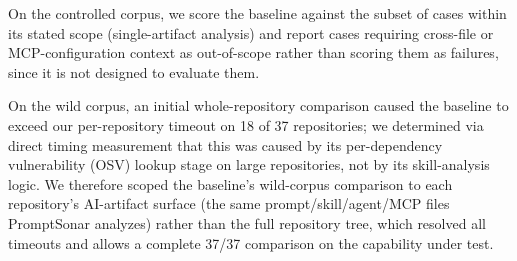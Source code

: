 \documentclass[sigconf,anonymous,review]{acmart}
\newcommand{\sysname}{PromptSonar}
\begin{document}
On the controlled corpus, we score the baseline against the subset of cases within its stated scope (single-artifact analysis) and report cases requiring cross-file or MCP-configuration context as out-of-scope rather than scoring them as failures, since it is not designed to evaluate them.

On the wild corpus, an initial whole-repository comparison caused the baseline to exceed our per-repository timeout on 18 of 37 repositories; we determined via direct timing measurement that this was caused by its per-dependency vulnerability (OSV) lookup stage on large repositories, not by its skill-analysis logic. We therefore scoped the baseline's wild-corpus comparison to each repository's AI-artifact surface (the same prompt/skill/agent/MCP files \sysname{} analyzes) rather than the full repository tree, which resolved all timeouts and allows a complete 37/37 comparison on the capability under test.
\end{document}
